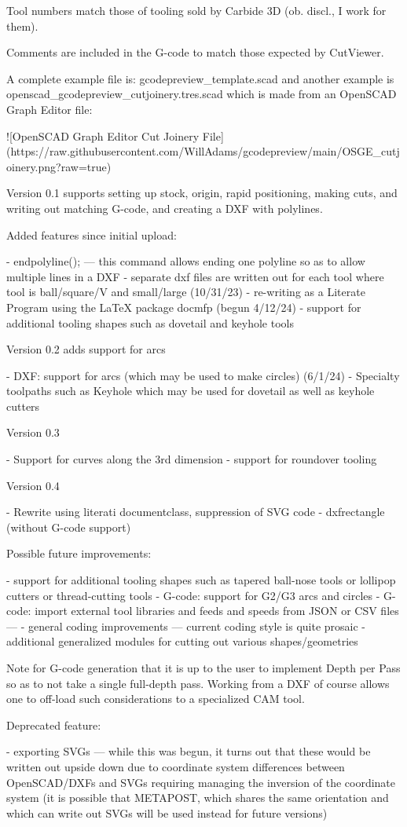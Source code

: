 \documentclass{ltxdoc}
\begin{document}
\begin{readme}
Tool numbers match those of tooling sold by Carbide 3D 
(ob. discl., I work for them). 

Comments are included in the G-code to match those 
expected by CutViewer.

A complete example file is: gcodepreview_template.scad 
and another example is openscad_gcodepreview_cutjoinery.tres.scad 
which is made from an OpenSCAD Graph Editor file:

![OpenSCAD Graph Editor Cut Joinery File](https://raw.githubusercontent.com/WillAdams/gcodepreview/main/OSGE_cutjoinery.png?raw=true)

Version 0.1 supports setting up stock, origin, rapid 
positioning, making cuts, and writing out matching 
G-code, and creating a DXF with polylines.

Added features since initial upload:

 - endpolyline(); --- this command allows ending one polyline so as to allow multiple lines in a DXF
 - separate dxf files are written out for each tool where tool is ball/square/V and small/large (10/31/23)
 - re-writing as a Literate Program using the LaTeX package docmfp (begun 4/12/24) 
 - support for additional tooling shapes such as dovetail and keyhole tools

Version 0.2 adds support for arcs 

 - DXF: support for arcs (which may be used to make circles) (6/1/24)
 - Specialty toolpaths such as Keyhole which may be used for dovetail as well as keyhole cutters

Version 0.3 

 - Support for curves along the 3rd dimension
 - support for roundover tooling
 
Version 0.4

 - Rewrite using literati documentclass, suppression of SVG code
 - dxfrectangle (without G-code support)

Possible future improvements:

 - support for additional tooling shapes such as tapered ball-nose tools or lollipop cutters or thread-cutting tools
 - G-code: support for G2/G3 arcs and circles
 - G-code: import external tool libraries and feeds and speeds from JSON or CSV files ---
 - general coding improvements --- current coding style is quite prosaic
 - additional generalized modules for cutting out various shapes/geometries

Note for G-code generation that it is up to the user 
to implement Depth per Pass so as to not take a 
single full-depth pass. Working from a DXF of course 
allows one to off-load such considerations to a 
specialized CAM tool.

Deprecated feature:

 - exporting SVGs --- while this was begun, it turns out that these would be written out upside down due to coordinate system differences between OpenSCAD/DXFs and SVGs requiring managing the inversion of the coordinate system (it is possible that METAPOST, which shares the same orientation and which can write out SVGs will be used instead for future versions)

\end{readme}
\end{document}

